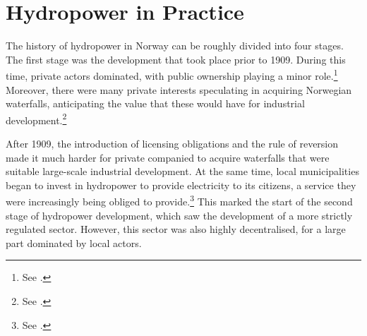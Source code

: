 
%
%
%
%
%
%

\section{Hydropower in Practice}

The history of hydropower in Norway can be roughly divided into four stages. The first stage was the development that took place prior to 1909. During this time, private actors dominated, with public ownership playing a minor role.\footnote{See \cite{otprp61}.} Moreover, there were many private interests speculating in acquiring Norwegian waterfalls, anticipating the value that these would have for industrial development.\footnote{See \cite[30-31]{nou04}.}

After 1909, the introduction of licensing obligations and the rule of reversion made it much harder for private companied to acquire waterfalls that were suitable large-scale industrial development. At the same time, local municipalities began to invest in hydropower to provide electricity to its citizens, a service they were increasingly being obliged to provide.\footnote{See \cite{otprp61}.} This marked the start of the second stage of hydropower development, which saw the development of a more strictly regulated sector. However, this sector was also highly decentralised, for a large part dominated by local actors.

